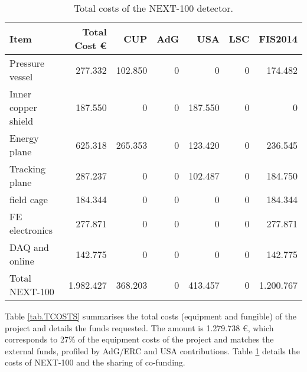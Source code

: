 %
\begin{table}[h!]
\begin{center}
\begin{tabular}{|l|r|r|r|r|r|r|}
\hline
 Item               & Total Cost \euro & CUP	 & AdG & USA     & LSC & FIS2014   \\
 \hline
Pressure vessel     &   277.332        & 102.850 &   0 &       0 &   0 &   174.482 \\ 
Inner copper shield &   187.550        &       0 &   0 & 187.550 &   0 & 	 0 \\ 
Energy plane	    &   625.318        & 265.353 &   0 & 123.420 &   0 &   236.545 \\ 
Tracking plane	    &   287.237        &       0 &   0 & 102.487 &   0 &   184.750 \\ 
field cage	    &   184.344        &       0 &   0 &       0 &   0 &   184.344 \\ 
FE electronics	    &   277.871        &       0 &   0 &       0 &   0 &   277.871 \\
DAQ and online      &   142.775        &       0 &   0 &       0 &   0 &   142.775 \\ 
Total NEXT-100	    & 1.982.427        & 368.203 &   0 & 413.457 &   0 & 1.200.767 \\ 
  \hline
\end{tabular}  
\caption{Total costs of the NEXT-100 detector.}
\label{tab.TN100}
\end{center}
\end{table} 
 
Table \ref{tab.TCOSTS} summarises the total costs (equipment and fungible) of the project and details the funds requested. The amount is 1.279.738 \euro, which corresponds to 27\% of the equipment costs of the project and matches the external funds, profiled by AdG/ERC and USA contributions. Table \ref{tab.TN100} details the costs of NEXT-100 and the sharing of co-funding. 

